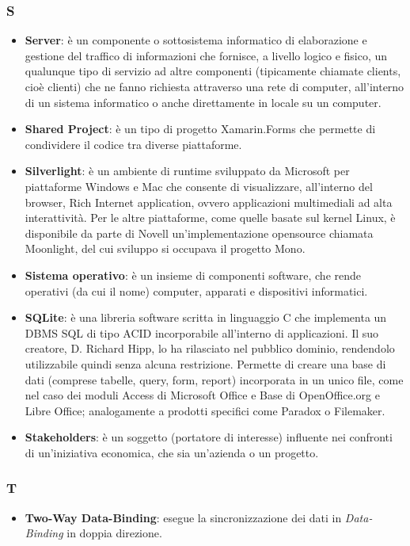 \subsubsection{S}
\begin{itemize}
	\item \textbf{Server}: è un componente o sottosistema informatico di elaborazione e gestione del traffico di informazioni che fornisce, a livello logico e fisico, un qualunque tipo di servizio ad altre componenti (tipicamente chiamate clients, cioè clienti) che ne fanno richiesta attraverso una rete di computer, all'interno di un sistema informatico o anche direttamente in locale su un computer.
	\item \textbf{Shared Project}: è un tipo di progetto Xamarin.Forms che permette di condividere il codice tra diverse piattaforme.
	\item \textbf{Silverlight}:  è un ambiente di runtime sviluppato da Microsoft per piattaforme Windows e Mac che consente di visualizzare, all'interno del browser, Rich Internet application, ovvero applicazioni multimediali ad alta interattività. Per le altre piattaforme, come quelle basate sul kernel Linux, è disponibile da parte di Novell un'implementazione opensource chiamata Moonlight, del cui sviluppo si occupava il progetto Mono.
	\item \textbf{Sistema operativo}: è un insieme di componenti software, che rende operativi (da cui il nome) computer, apparati e dispositivi informatici.
	\item \textbf{SQLite}:  è una libreria software scritta in linguaggio C che implementa un DBMS SQL di tipo ACID incorporabile all'interno di applicazioni. Il suo creatore, D. Richard Hipp, lo ha rilasciato nel pubblico dominio, rendendolo utilizzabile quindi senza alcuna restrizione. Permette di creare una base di dati (comprese tabelle, query, form, report) incorporata in un unico file, come nel caso dei moduli Access di Microsoft Office e Base di OpenOffice.org e Libre Office; analogamente a prodotti specifici come Paradox o Filemaker.
	\item \textbf{Stakeholders}: è un soggetto (portatore di interesse) influente nei confronti di un'iniziativa economica, che sia un'azienda o un progetto.
	
\end{itemize}

\subsubsection{T}
\begin{itemize}
	\item \textbf{Two-Way Data-Binding}: esegue la sincronizzazione dei dati in \textit{Data-Binding} in doppia direzione.
\end{itemize}

